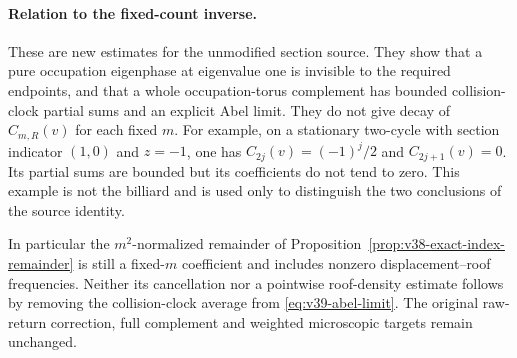 \paragraph{Relation to the fixed-count inverse.}
These are new estimates for the unmodified section source. They show
that a pure occupation eigenphase at eigenvalue one is invisible to the
required endpoints, and that a whole occupation-torus complement has
bounded collision-clock partial sums and an explicit Abel limit.
They do not give decay of $C_{m,R}(v)$ for each fixed $m$.
For example, on a stationary two-cycle with section indicator $(1,0)$
and $z=-1$, one has $C_{2j}(v)=(-1)^j/2$ and $C_{2j+1}(v)=0$.
Its partial sums are bounded but its coefficients do not tend to zero.
This example is not the billiard and is used only to distinguish the
two conclusions of the source identity.

In particular the $m^2$-normalized remainder of
Proposition~\ref{prop:v38-exact-index-remainder} is still a fixed-$m$
coefficient and includes nonzero displacement--roof frequencies. Neither
its cancellation nor a pointwise roof-density estimate follows by
removing the collision-clock average from \eqref{eq:v39-abel-limit}.
The original raw-return correction, full complement and weighted
microscopic targets remain unchanged.
